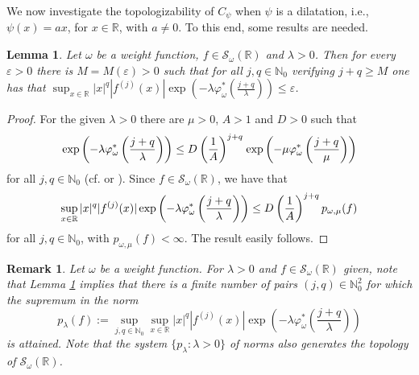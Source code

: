 \documentclass[12pt,reqno]{amsart} %
\newtheorem{lemma}[theorem]{Lemma}
\newtheorem{remark}[theorem]{Remark}
\numberwithin{equation}{section}
\begin{document}
				We now  investigate the topologizability of $C_\psi$ when $\psi$ is a dilatation, i.e., $\psi(x)=ax$, for $x\in \mathbb{R}$, with $a\not=0$. To this end, some results are needed.
				
				
				\begin{lemma}\label{lemmaBeurling} Let $\omega$ be a weight function, 
					$f\in \mathcal{S}_\omega(\mathbb{R})$ and  $\lambda>0$. Then  for every $\varepsilon>0$ there is $M= M(\varepsilon)>0$ such that for all $j, q\in\mathbb{N}_0$ verifying $j+q\geq M$ one has that $\sup_{x\in\mathbb{R}} |x|^q |f^{(j)}(x)| \exp\left(-\lambda \varphi_\omega^*(\frac{j+q}{\lambda})\right)\leq \varepsilon$.
				\end{lemma}
				\begin{proof}
					For the given $\lambda>0$  there are $\mu>0$, $A>1$ and $D>0$ such that 
					\begin{equation*}
						\exp\left(-\lambda \varphi_\omega^*\left(\frac{j+q}{\lambda}\right)\right)\leq D \hspace{0.01cm} \left(\frac{1}{A}\right)^{j+q}\hspace{0.03cm} \exp\left(-\mu\varphi_\omega^*\left(\frac{j+q}{\mu}\right)\right)
					\end{equation*}
					for all $j,q\in\mathbb{N}_0$ (cf. \cite[Lemma 3.3]{jmaa} or \cite[Lemma A.1]{paley}). Since $f\in\mathcal{S}_\omega(\mathbb{R})$, we have  that 
					\begin{equation*}
						\sup_{x\in\mathbb{R}} |x|^q |f^{(j)}(x)| \exp\left(-\lambda \varphi_\omega^*\left(\frac{j+q}{\lambda}\right)\right)  \leq D \hspace{0.01cm} \left(\frac{1}{A}\right)^{j+q} p_{\omega,\mu}(f)
					\end{equation*} 
					for all $j,q\in\mathbb{N}_0$, with $p_{\omega,\mu}(f)<\infty$. The result easily follows. 
				\end{proof}
				
				\begin{remark}\label{R-Max} Let $\omega$ be a weight function. For $\lambda>0$ and $f\in \mathcal{S}_\omega(\mathbb{R})$ given,  
					note that Lemma \ref{lemmaBeurling} implies that there is a finite number of pairs $(j,q)\in\mathbb{N}^2_0$ for which the supremum in the norm 
					\begin{equation*}
						p_{\lambda}(f):=\sup_{j,q\in\mathbb{N}_0}\sup_{x\in\mathbb{R}} |x|^q |f^{(j)}(x)|  \exp\left(-\lambda \varphi_\omega^*\left(\frac{j+q}{\lambda}\right)\right)
					\end{equation*} 
					is attained. Note that the system $\{p_\lambda: \lambda>0\}$ of norms also generates the topology of $\mathcal{S}_\omega(\mathbb{R})$.
				\end{remark}
				
\end{document}
